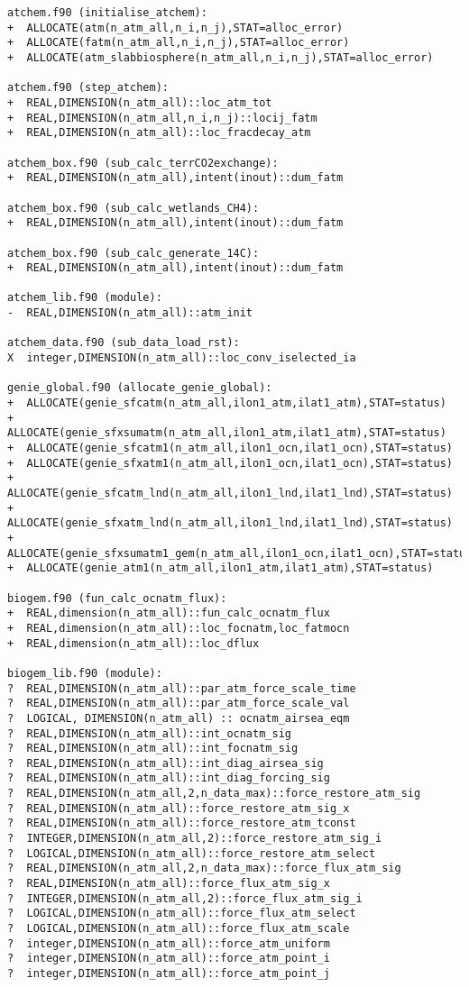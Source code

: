 \documentclass[a4paper,10pt,article]{memoir}
\begin{document}
\begin{verbatim}
atchem.f90 (initialise_atchem):
+  ALLOCATE(atm(n_atm_all,n_i,n_j),STAT=alloc_error)
+  ALLOCATE(fatm(n_atm_all,n_i,n_j),STAT=alloc_error)
+  ALLOCATE(atm_slabbiosphere(n_atm_all,n_i,n_j),STAT=alloc_error)

atchem.f90 (step_atchem):
+  REAL,DIMENSION(n_atm_all)::loc_atm_tot
+  REAL,DIMENSION(n_atm_all,n_i,n_j)::locij_fatm
+  REAL,DIMENSION(n_atm_all)::loc_fracdecay_atm

atchem_box.f90 (sub_calc_terrCO2exchange):
+  REAL,DIMENSION(n_atm_all),intent(inout)::dum_fatm

atchem_box.f90 (sub_calc_wetlands_CH4):
+  REAL,DIMENSION(n_atm_all),intent(inout)::dum_fatm

atchem_box.f90 (sub_calc_generate_14C):
+  REAL,DIMENSION(n_atm_all),intent(inout)::dum_fatm

atchem_lib.f90 (module):
-  REAL,DIMENSION(n_atm_all)::atm_init

atchem_data.f90 (sub_data_load_rst):
X  integer,DIMENSION(n_atm_all)::loc_conv_iselected_ia

genie_global.f90 (allocate_genie_global):
+  ALLOCATE(genie_sfcatm(n_atm_all,ilon1_atm,ilat1_atm),STAT=status)
+  ALLOCATE(genie_sfxsumatm(n_atm_all,ilon1_atm,ilat1_atm),STAT=status)
+  ALLOCATE(genie_sfcatm1(n_atm_all,ilon1_ocn,ilat1_ocn),STAT=status)
+  ALLOCATE(genie_sfxatm1(n_atm_all,ilon1_ocn,ilat1_ocn),STAT=status)
+  ALLOCATE(genie_sfcatm_lnd(n_atm_all,ilon1_lnd,ilat1_lnd),STAT=status)
+  ALLOCATE(genie_sfxatm_lnd(n_atm_all,ilon1_lnd,ilat1_lnd),STAT=status)
+  ALLOCATE(genie_sfxsumatm1_gem(n_atm_all,ilon1_ocn,ilat1_ocn),STAT=status)
+  ALLOCATE(genie_atm1(n_atm_all,ilon1_atm,ilat1_atm),STAT=status)

biogem.f90 (fun_calc_ocnatm_flux):
+  REAL,dimension(n_atm_all)::fun_calc_ocnatm_flux
+  REAL,dimension(n_atm_all)::loc_focnatm,loc_fatmocn
+  REAL,dimension(n_atm_all)::loc_dflux

biogem_lib.f90 (module):
?  REAL,DIMENSION(n_atm_all)::par_atm_force_scale_time
?  REAL,DIMENSION(n_atm_all)::par_atm_force_scale_val
?  LOGICAL, DIMENSION(n_atm_all) :: ocnatm_airsea_eqm
?  REAL,DIMENSION(n_atm_all)::int_ocnatm_sig
?  REAL,DIMENSION(n_atm_all)::int_focnatm_sig
?  REAL,DIMENSION(n_atm_all)::int_diag_airsea_sig
?  REAL,DIMENSION(n_atm_all)::int_diag_forcing_sig
?  REAL,DIMENSION(n_atm_all,2,n_data_max)::force_restore_atm_sig
?  REAL,DIMENSION(n_atm_all)::force_restore_atm_sig_x
?  REAL,DIMENSION(n_atm_all)::force_restore_atm_tconst
?  INTEGER,DIMENSION(n_atm_all,2)::force_restore_atm_sig_i
?  LOGICAL,DIMENSION(n_atm_all)::force_restore_atm_select
?  REAL,DIMENSION(n_atm_all,2,n_data_max)::force_flux_atm_sig
?  REAL,DIMENSION(n_atm_all)::force_flux_atm_sig_x
?  INTEGER,DIMENSION(n_atm_all,2)::force_flux_atm_sig_i
?  LOGICAL,DIMENSION(n_atm_all)::force_flux_atm_select
?  LOGICAL,DIMENSION(n_atm_all)::force_flux_atm_scale
?  integer,DIMENSION(n_atm_all)::force_atm_uniform
?  integer,DIMENSION(n_atm_all)::force_atm_point_i
?  integer,DIMENSION(n_atm_all)::force_atm_point_j


\end{verbatim}
\end{document}
